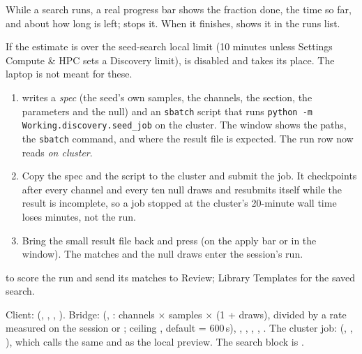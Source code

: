 While a search runs, a real progress bar shows the fraction done, the time so far, and about how
long is left;  stops it. When it finishes,  shows it in the runs list.

\begin{watchout}
If the estimate is over the seed-search local limit (10 minutes unless Settings \textrightarrow{}
Compute \& HPC sets a Discovery limit),  is disabled and  takes its place. The laptop is not meant for these.
\begin{enumerate}
  \item {} writes a \emph{spec} (the seed's own samples, the channels, the
        section, the parameters and the null) and an \texttt{sbatch} script that runs
        \texttt{python -m Working.discovery.seed\_job} on the cluster. The window shows the paths,
        the \texttt{sbatch} command, and where the result file is expected. The run row now reads
        \emph{on cluster}.
  \item Copy the spec and the script to the cluster and submit the job. It checkpoints after every
        channel and every ten null draws and resubmits itself while the result is incomplete, so a
        job stopped at the cluster's 20-minute wall time loses minutes, not the run.
  \item Bring the small result file back and press  (on the apply bar or in
        the window). The matches and the null draws enter the session's run.
\end{enumerate}
\end{watchout}

 to score the run and send its matches to Review; Library
\textrightarrow{} Templates for the saved search.

\begin{underthehood}
Client:  (,
, , ). Bridge:
  (,
: channels \(\times\) samples \(\times\) (1 + draws), divided by a rate measured
on the session or ; ceiling , default
 = 600\,s), , ,
, , . The cluster job:
 (, , ), which
calls the same  and  as the local preview. The
search block is .
\end{underthehood}

